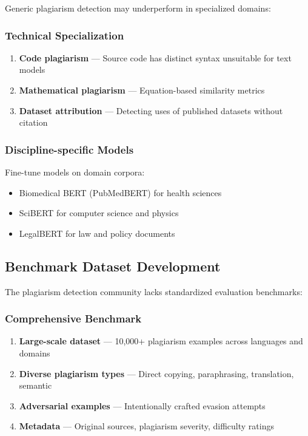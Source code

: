 Generic plagiarism detection may underperform in specialized domains:

\subsubsection{Technical Specialization}

\begin{enumerate}
  \item \textbf{Code plagiarism} --- Source code has distinct syntax unsuitable for text models
  \item \textbf{Mathematical plagiarism} --- Equation-based similarity metrics
  \item \textbf{Dataset attribution} --- Detecting uses of published datasets without citation
\end{enumerate}

\subsubsection{Discipline-specific Models}

Fine-tune models on domain corpora:
\begin{itemize}
  \item Biomedical BERT (PubMedBERT) for health sciences
  \item SciBERT for computer science and physics
  \item LegalBERT for law and policy documents
\end{itemize}

\subsection{Benchmark Dataset Development}

The plagiarism detection community lacks standardized evaluation benchmarks:

\subsubsection{Comprehensive Benchmark}

\begin{enumerate}
  \item \textbf{Large-scale dataset} --- 10,000+ plagiarism examples across languages and domains
  \item \textbf{Diverse plagiarism types} --- Direct copying, paraphrasing, translation, semantic
  \item \textbf{Adversarial examples} --- Intentionally crafted evasion attempts
  \item \textbf{Metadata} --- Original sources, plagiarism severity, difficulty ratings
\end{enumerate}

